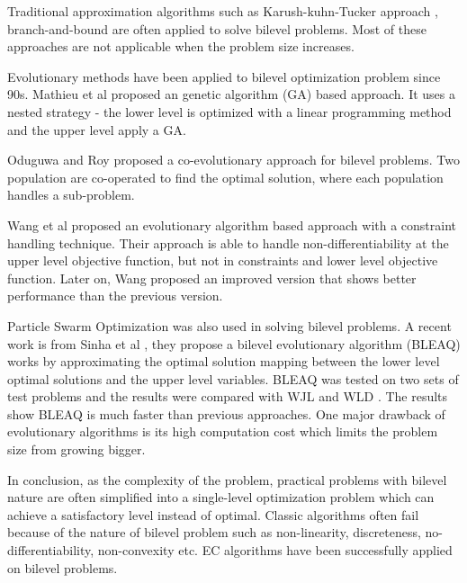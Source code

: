 Traditional approximation algorithms such as Karush-kuhn-Tucker approach \cite{Bianco:2009ej, Herskovits:2000be}, branch-and-bound \cite{Bard:1982gsa} are often applied to solve bilevel problems. Most of these approaches are not applicable when the problem size increases.

Evolutionary methods have been applied to bilevel optimization problem since 90s. Mathieu et al \cite{Mathieu:2011dw} proposed an genetic algorithm (GA) based approach. It uses a nested strategy - the lower level is optimized with a linear programming method and the upper level apply a GA.

Oduguwa and Roy \cite{Oduguwa:2002kr} proposed a co-evolutionary approach for bilevel problems. Two population are co-operated to find the optimal solution, where each population handles a sub-problem. 

Wang et al \cite{Wang:2005fa} proposed an evolutionary algorithm based approach with a constraint handling technique.  Their approach is able to handle non-differentiability at the upper level objective function, but not in constraints and lower  level objective function. Later on, Wang proposed an improved version \cite{Wang:2011di} that shows better performance than the previous version.

Particle Swarm Optimization \cite{Li:2006br} was also used in solving bilevel problems.
A recent work is from Sinha et al \cite{Sinha:2013tn}, they propose a bilevel evolutionary algorithm (BLEAQ) works by approximating the optimal solution mapping between the lower level optimal solutions and the upper level variables.  BLEAQ was tested on two sets of test problems and the results were compared with WJL \cite{Wang:2005fa} and WLD \cite{Wang:2011di}. The results show BLEAQ is much faster than previous approaches.
One major drawback of evolutionary algorithms is its high computation cost which limits the problem size from growing bigger.

In conclusion, as the complexity of the problem, practical problems with bilevel nature are often simplified into a single-level optimization problem which can achieve a satisfactory level instead of optimal. Classic algorithms often fail because of the nature of bilevel problem such as non-linearity, discreteness, no-differentiability, non-convexity etc. EC algorithms have been successfully applied on bilevel problems.




